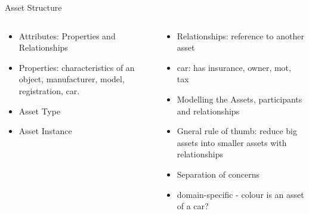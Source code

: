 \documentclass[pdf,table]{beamer}
\begin{document}
\begin{frame}{Asset Structure}
	\begin{columns}[T]
		\begin{column}{0.48\textwidth}
			\begin{itemize}
				\item Attributes: Properties and Relationships 
				\item Properties: characteristics of an object, manufacturer, model, registration, car.
				\item Asset Type
				\item Asset Instance
			\end{itemize}
		\end{column}
		\begin{column}{0.48\textwidth}
			\begin{itemize}
				\item Relationships: reference to another asset
				\item car: has insurance, owner, mot, tax
				\item Modelling the Assets, participants and relationships
				\item Gneral rule of thumb: reduce big assets into smaller assets with relationships
				\item Separation of concerns
				\item domain-specific - colour is an asset of a car? %
			\end{itemize}
		\end{column}
	\end{columns}	
\end{frame}
\end{document}
